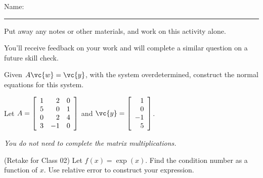 \documentclass[12pt,letterpaper,noanswers]{exam}
\begin{document}
 \pdfpageheight 11in 
  \pdfpagewidth 8.5in

\noindent Name: \rule{2.5in}{0.5pt}

\noindent Put away any notes or other materials, and work on this activity alone.

\noindent You'll receive feedback on your work and will complete a similar question on a future skill check.


\begin{questions}
\item Given $A\vc{w} = \vc{y}$, with the system overdetermined, construct the normal equations for this system.

Let $A = \left[\begin{array}{r r r}
1 & 2 & 0 \\
5 & 0 & 1 \\
0 & 2 & 4 \\
3 & -1 & 0 \\
\end{array}\right]$ and $\vc{y} =  \left[\begin{array}{r}
1 \\ 0 \\ -1 \\ 5 \end{array}\right]$.  

\emph{You do not need to complete the matrix multiplications.}


\vspace{8cm}
\item (Retake for Class 02)
Let $f(x) = \exp(x)$.  Find the condition number as a function of $x$.  Use relative error to construct your expression.
\end{questions}
\end{document}
